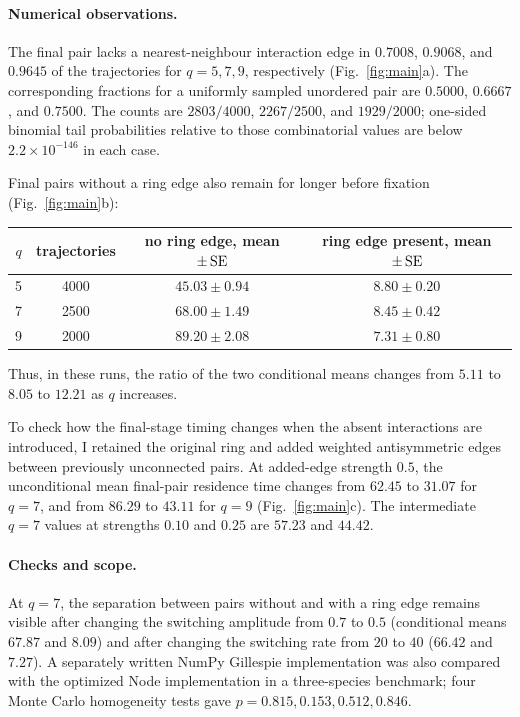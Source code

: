 \documentclass[10pt,a4paper]{article}
\newcommand{\se}{\mathop{\rm SE}}
\begin{document}
\paragraph{Numerical observations.}
The final pair lacks a nearest-neighbour interaction edge in $0.7008$, $0.9068$, and $0.9645$ of the trajectories for $q=5,7,9$, respectively (Fig.~\ref{fig:main}a).  The corresponding fractions for a uniformly sampled unordered pair are $0.5000$, $0.6667$, and $0.7500$.  The counts are $2803/4000$, $2267/2500$, and $1929/2000$; one-sided binomial tail probabilities relative to those combinatorial values are below $2.2\times10^{-146}$ in each case.

Final pairs without a ring edge also remain for longer before fixation (Fig.~\ref{fig:main}b):
\begin{center}
\small
\begin{tabular}{@{}cccc@{}}
\toprule
$q$ & trajectories & no ring edge, mean $\pm\se$ & ring edge present, mean $\pm\se$\\
\midrule
5 & 4000 & $45.03\pm0.94$ & $8.80\pm0.20$\\
7 & 2500 & $68.00\pm1.49$ & $8.45\pm0.42$\\
9 & 2000 & $89.20\pm2.08$ & $7.31\pm0.80$\\
\bottomrule
\end{tabular}
\end{center}
Thus, in these runs, the ratio of the two conditional means changes from $5.11$ to $8.05$ to $12.21$ as $q$ increases.

To check how the final-stage timing changes when the absent interactions are introduced, I retained the original ring and added weighted antisymmetric edges between previously unconnected pairs.  At added-edge strength $0.5$, the unconditional mean final-pair residence time changes from $62.45$ to $31.07$ for $q=7$, and from $86.29$ to $43.11$ for $q=9$ (Fig.~\ref{fig:main}c).  The intermediate $q=7$ values at strengths $0.10$ and $0.25$ are $57.23$ and $44.42$.

\paragraph{Checks and scope.}
At $q=7$, the separation between pairs without and with a ring edge remains visible after changing the switching amplitude from $0.7$ to $0.5$ (conditional means $67.87$ and $8.09$) and after changing the switching rate from $20$ to $40$ ($66.42$ and $7.27$).  A separately written NumPy Gillespie implementation was also compared with the optimized Node implementation in a three-species benchmark; four Monte Carlo homogeneity tests gave $p=0.815,0.153,0.512,0.846$.
\end{document}
